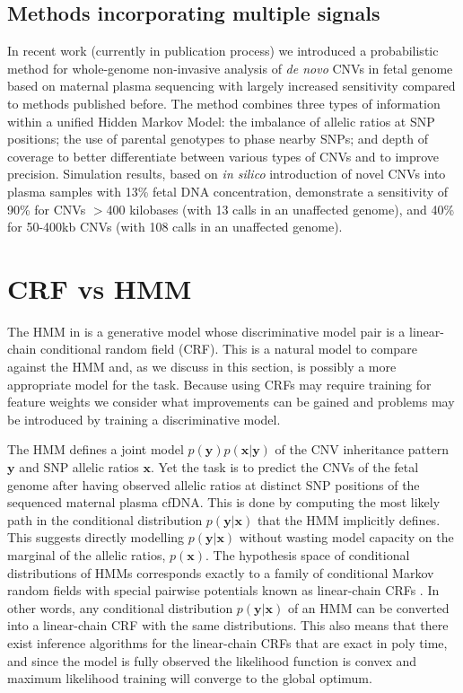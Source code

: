 \documentclass[11pt]{article}
\newcommand{\cnv}{\mathbf{y}}
\newcommand{\snp}{\mathbf{x}}
\begin{document}
\subsection{Methods incorporating multiple signals}
In recent work \citep{rampasek2014fcnv} (currently in publication process) we introduced a probabilistic method for whole-genome non-invasive analysis of \textit{de novo} CNVs in fetal genome based on maternal plasma sequencing with largely increased sensitivity compared to methods published before. The method combines three types of information within a unified Hidden Markov Model: the imbalance of allelic ratios at SNP positions; the use of parental genotypes to phase nearby SNPs; and depth of coverage to better differentiate between various types of CNVs and to improve precision. Simulation results, based on \emph{in silico} introduction of novel CNVs into plasma samples with 13\% fetal DNA concentration, demonstrate a sensitivity of 90\% for CNVs $>$400 kilobases (with 13 calls in an unaffected genome), and 40\% for 50-400kb CNVs (with 108 calls in an unaffected genome).

\section{CRF vs HMM}
The HMM in \citep{rampasek2014fcnv} is a generative model whose discriminative model pair is a linear-chain conditional random field (CRF). This is a natural model to compare against the HMM and, as we discuss in this section, is possibly a more appropriate model for the task. Because using CRFs may require training for feature weights we consider what improvements can be gained and problems may be introduced by training a discriminative model.

The HMM defines a joint model $p(\cnv) p(\snp | \cnv)$ of the CNV inheritance pattern $\cnv$ and SNP allelic ratios $\snp$. Yet the task is to predict the CNVs of the fetal genome after having observed allelic ratios at distinct SNP positions of the sequenced maternal plasma cfDNA. This is done by computing the most likely path in the conditional distribution $p(\cnv | \snp)$ that the HMM implicitly defines. This suggests directly modelling $p(\cnv | \snp)$ without wasting model capacity on the marginal of the allelic ratios, $p(\snp)$. The hypothesis space of conditional distributions of HMMs corresponds exactly to a family of conditional Markov random fields with special pairwise potentials known as linear-chain CRFs \citep{sutton2012}. In other words, any conditional distribution $p(\cnv | \snp)$ of an HMM can be converted into a linear-chain CRF with the same distributions. This also means that there exist inference algorithms for the linear-chain CRFs that are exact in poly time, and since the model is fully observed the likelihood function is convex and maximum likelihood training will converge to the global optimum.
\end{document}
